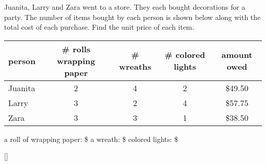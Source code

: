 \documentclass[12pt,letterpaper]{memoir}
\begin{document}
%
%
\myWideProblemWithContent
{
    Juanita, Larry and Zara went to a store.
    They each bought decorations for a party. 
    The number of items bought by each person is shown below
    along with the total cost of each purchase. 
    Find the unit price of each item. 
    \begin{center}
        \small
        \begin{tabular}{lcccc}
            person & \# rolls wrapping paper & \# wreaths & \# colored lights & amount owed \\
            \toprule
            Juanita  & 2  & 4 & 2 & \$49.50  \\
            Larry    & 3  & 2 & 4 & \$57.75  \\
            Zara     & 3  & 3 & 1 & \$38.50  \\
        \end{tabular}
    \end{center}
    \mySystemTable[7]
    \small
    a roll of wrapping paper: \$
    \hfill 
    a wreath: \$
    \hfill 
    colored lights: \$
}[\small]
\end{document}
